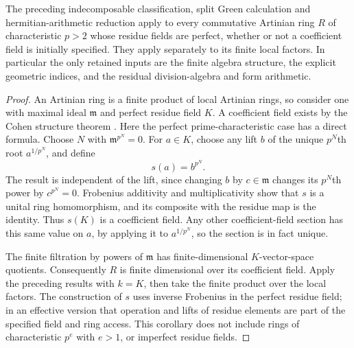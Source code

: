 \begin{corollary}
\label{C:perfect-residue-Artin-reduction}
The preceding indecomposable classification, split Green
calculation and hermitian-arithmetic reduction apply to every
commutative Artinian ring $R$ of characteristic $p>2$ whose
residue fields are perfect, whether or not a coefficient
field is initially specified. They apply separately to its
finite local factors. In particular the only retained inputs
are the finite algebra structure, the explicit geometric
indices, and the residual division-algebra and form arithmetic.
\end{corollary}
\begin{proof}
An Artinian ring is a finite product of local Artinian rings,
so consider one with maximal ideal $\mathfrak m$ and perfect
residue field $K$. A coefficient field exists by the Cohen
structure theorem
\cite[Theorem 10.160.8, Tag 032A]{C-StacksArtinianPerfect}.
Here the perfect prime-characteristic case has a direct
formula. Choose $N$ with $\mathfrak m^{p^N}=0$.
For $a\in K$, choose any lift $b$ of the unique
$p^N$th root $a^{1/p^N}$, and define
\[
                         s(a)=b^{p^N}.                   \tag{C.3.P6}
\]
The result is independent of the lift, since changing $b$
by $c\in\mathfrak m$ changes its $p^N$th power by $c^{p^N}=0$.
Frobenius additivity and multiplicativity show that $s$ is
a unital ring homomorphism, and its composite with the
residue map is the identity. Thus $s(K)$ is a coefficient
field. Any other coefficient-field section has this same
value on $a$, by applying it to $a^{1/p^N}$, so the section
is in fact unique.

The finite filtration by powers of $\mathfrak m$ has
finite-dimensional $K$-vector-space quotients.
Consequently $R$ is finite dimensional over its coefficient
field. Apply the preceding results with $k=K$, then take
the finite product over the local factors.
The construction of $s$ uses inverse Frobenius in the
perfect residue field; in an effective version that
operation and lifts of residue elements are part of the
specified field and ring access.
This corollary does not include rings of characteristic
$p^e$ with $e>1$, or imperfect residue fields.
\end{proof}


